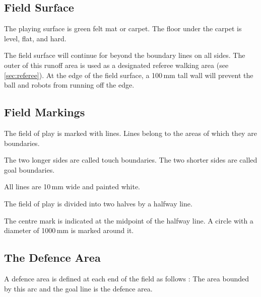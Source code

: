 \subsection{Field Surface}
The playing surface is green felt mat or carpet.
The floor under the carpet is level, flat, and hard.

The field surface will continue for  beyond
the boundary lines on all sides.
The outer  of this runoff area is used as a
designated referee walking area (see \autoref{sec:referee}).
At the edge of the field surface, a 100\,mm tall wall will prevent the ball and
robots from running off the edge.

\subsection{Field Markings}
The field of play is marked with lines.
Lines belong to the areas of which they are boundaries.

The two longer sides are called touch boundaries.
The two shorter sides are called goal boundaries.

All lines are 10\,mm wide and painted white.

The field of play is divided into two halves by a halfway line.

The centre mark is indicated at the midpoint of the halfway line.
A circle with a diameter of 1000\,mm is marked around it.

\subsection{The Defence Area}

A defence area is defined at each end of the field as follows
:
The area bounded by this arc and the goal line is the defence area.


